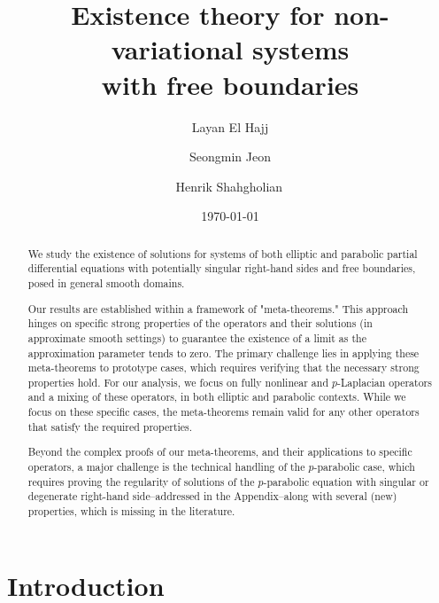 \documentclass[11pt,oneside,english]{amsart}
\author{Layan El Hajj}
\author{Seongmin Jeon}
\author{Henrik Shahgholian\,
}
\numberwithin{equation}{section}
\theoremstyle{plain}
\numberwithin{equation}{section}
\begin{document}
\title[systems  with free boundaries  ]
{Existence theory for non-variational  systems \\ with free boundaries }


\date{\today}

\begin{abstract}
We study the existence of solutions for systems of both elliptic and parabolic partial differential equations with potentially singular right-hand sides and free boundaries, posed in general smooth domains.

Our results are established within a framework of "meta-theorems." This approach hinges on specific strong properties of the operators and their solutions (in approximate smooth settings) to guarantee the existence of a limit as the approximation parameter tends to zero. The primary challenge lies in applying these meta-theorems to prototype cases, which requires verifying that the necessary strong properties hold. For our analysis, we focus on fully nonlinear and $p$-Laplacian operators  and a mixing of these operators, in both elliptic and parabolic contexts.
While we focus on these specific cases, the meta-theorems remain valid for any other operators that satisfy the required properties.

Beyond the complex proofs of our meta-theorems, and their applications to specific operators, a major challenge is the technical handling of the $p$-parabolic case, which requires proving  the regularity of  solutions of the $p$-parabolic equation with singular or degenerate right-hand side--addressed in the Appendix--along with  several (new) properties, which is missing in the literature. 




\end{abstract}



\maketitle
\setcounter{tocdepth}{2}

\tableofcontents







\section{Introduction}
\end{document}
